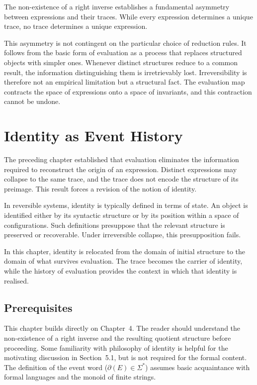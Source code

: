 \documentclass[12pt, oneside]{amsbook}
\theoremstyle{plain}
\theoremstyle{definition}
\theoremstyle{remark}
\begin{document}
The non-existence of a right inverse establishes a fundamental asymmetry between
expressions and their traces. While every expression determines a unique trace,
no trace determines a unique expression.

This asymmetry is not contingent on the particular choice of reduction rules. It
follows from the basic form of evaluation as a process that replaces structured
objects with simpler ones. Whenever distinct structures reduce to a common
result, the information distinguishing them is irretrievably lost. Irreversibility
is therefore not an empirical limitation but a structural fact. The evaluation
map contracts the space of expressions onto a space of invariants, and this
contraction cannot be undone.

\chapter{Identity as Event History}
\label{ch:identity}

The preceding chapter established that evaluation eliminates the information
required to reconstruct the origin of an expression. Distinct expressions may
collapse to the same trace, and the trace does not encode the structure of its
preimage. This result forces a revision of the notion of identity.

In reversible systems, identity is typically defined in terms of state. An
object is identified either by its syntactic structure or by its position within
a space of configurations. Such definitions presuppose that the relevant
structure is preserved or recoverable. Under irreversible collapse, this
presupposition fails.

In this chapter, identity is relocated from the domain of initial structure to
the domain of what survives evaluation. The trace becomes the carrier of
identity, while the history of evaluation provides the context in which that
identity is realised.

\section{Prerequisites}

This chapter builds directly on Chapter~4. The reader should understand the non-existence of a right inverse and the resulting quotient structure before proceeding. Some familiarity with philosophy of identity is helpful for the motivating discussion in Section~5.1, but is not required for the formal content. The definition of the event word ($\partial(E) \in \Sigma^*$) assumes basic acquaintance with formal languages and the monoid of finite strings.
\end{document}
